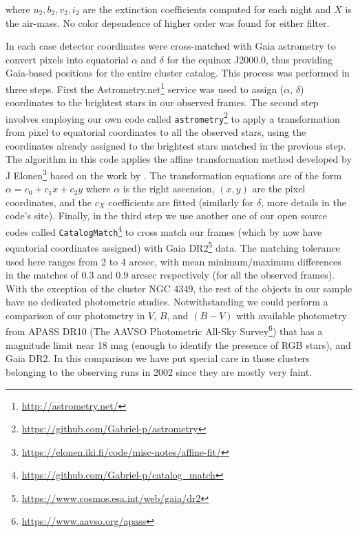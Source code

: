 \documentclass[draft]{aa}
\begin{document}
\noindent where $u_2, b_2, v_2, i_2$ are the extinction coefficients computed
for each night and $X$ is the air-mass. No color dependence of higher
order was found for either filter.

In each case detector coordinates were cross-matched with Gaia astrometry to
convert pixels into equatorial $\alpha$ and $\delta$ for the equinox J2000.0,
thus providing Gaia-based positions for the entire cluster catalog.
This process was performed in three steps. First the
Astrometry.net\footnote{\url{http://astrometry.net/}} service was used to
assign ($\alpha$, $\delta$) coordinates to the brightest stars in our observed
frames. The second step involves employing our own code called 
\texttt{astrometry}\footnote{\url{https://github.com/Gabriel-p/astrometry}} to
apply a transformation from pixel to equatorial coordinates to all the observed
stars, using the coordinates already assigned to the brightest stars matched in
the previous step. The algorithm in this code applies the affine transformation
method developed by
J Elonen\footnote{\url{https://elonen.iki.fi/code/misc-notes/affine-fit/}}
based on the work by \cite{Spath2004}. The transformation equations are of
the form $\alpha=c_0+c_1x+c_2y$ where $\alpha$ is the right ascension,
$(x, y)$ are the pixel coordinates, and the $c_X$ coefficients are fitted
(similarly for $\delta$, more details in the code's site).
Finally, in the third step we use another one of our open source codes called
\texttt{CatalogMatch}\footnote{\url{https://github.com/Gabriel-p/catalog_match}}
to cross match our frames (which by now have equatorial coordinates assigned)
with Gaia DR2\footnote{\url{https://www.cosmos.esa.int/web/gaia/dr2}} data. The
matching tolerance used here ranges from 2 to 4 arcsec, with mean
minimum/maximum differences in the matches of 0.3 and 0.9 arcsec
respectively (for all the observed frames).\\


With the exception of the cluster NGC 4349, the rest of the objects in our
sample have no dedicated photometric studies. Notwithstanding we could perform
a comparison of our photometry in $V$, $B$, and $(B-V)$ with available
photometry from APASS DR10 (The AAVSO Photometric All-Sky
Survey\footnote{\url{https://www.aavso.org/apass}}) that has a
magnitude limit near 18 mag (enough to identify the presence of RGB stars), and
Gaia DR2.
%
In this comparison we have put special care in those clusters belonging to the
observing runs in 2002 since they are mostly very faint.
\end{document}
